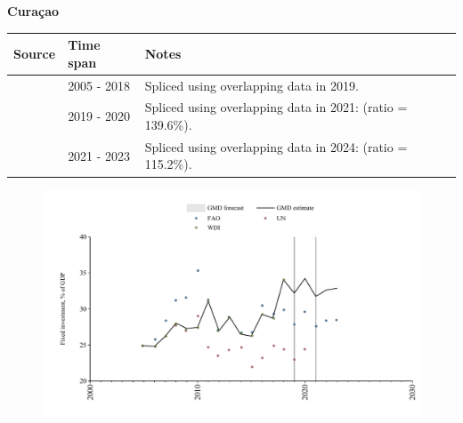 \documentclass[12pt,a4paper,landscape]{article}
\begin{document}
\begin{adjustbox}{max totalsize={\paperwidth}{\paperheight},center}
\begin{minipage}[t][\textheight][t]{\textwidth}
\vspace*{0.5cm}
{}
\begin{center}
{\Large\bfseries Curaçao}
\end{center}
\vspace{0.5cm}
\begin{table}[H]
\centering
\small
\begin{tabular}{|l|l|l|}
\hline
\textbf{Source} & \textbf{Time span} & \textbf{Notes} \\
\hline
\rowcolor{white}\cite{WDI}& 2005 - 2018 &Spliced using overlapping data in 2019.\\
\rowcolor{lightgray}\cite{UN}& 2019 - 2020 &Spliced using overlapping data in 2021: (ratio = 139.6\%).\\
\rowcolor{white}\cite{FAO}& 2021 - 2023 &Spliced using overlapping data in 2024: (ratio = 115.2\%).\\
\hline
\end{tabular}
\end{table}
\begin{figure}[H]
\centering
\includegraphics[width=\textwidth,height=0.6\textheight,keepaspectratio]{graphs/CUW_finv_GDP.pdf}
\end{figure}
\end{minipage}
\end{adjustbox}
\end{document}
